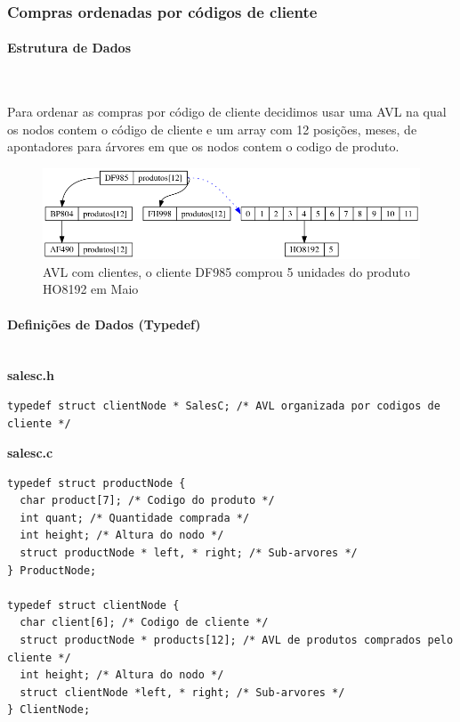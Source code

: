 \documentclass[10pt] {article}
\begin{document}
\newpage
\subsubsection{Compras ordenadas por códigos de cliente}
\paragraph{Estrutura de Dados}\mbox{}\\
\indent\par Para ordenar as compras por código de cliente decidimos usar uma AVL na qual os nodos contem
o código de cliente e um array com 12 posições, meses, de apontadores para árvores em que os nodos
contem o codigo de produto.

\begin{figure}[ht!]
\centering
\includegraphics[width=120mm]{avl_salesc.png}
\caption{AVL com clientes, o cliente DF985 comprou 5 unidades do produto HO8192 em Maio}
\end{figure}

\paragraph{Definições de Dados (Typedef)}\mbox{}\\
\textbf{salesc.h}
\begin{lstlisting}
typedef struct clientNode * SalesC; /* AVL organizada por codigos de cliente */
\end{lstlisting}
\textbf{salesc.c}
\begin{lstlisting}
typedef struct productNode {
  char product[7]; /* Codigo do produto */
  int quant; /* Quantidade comprada */
  int height; /* Altura do nodo */
  struct productNode * left, * right; /* Sub-arvores */
} ProductNode;

typedef struct clientNode {
  char client[6]; /* Codigo de cliente */
  struct productNode * products[12]; /* AVL de produtos comprados pelo cliente */
  int height; /* Altura do nodo */
  struct clientNode *left, * right; /* Sub-arvores */
} ClientNode;
\end{lstlisting}
\end{document}
